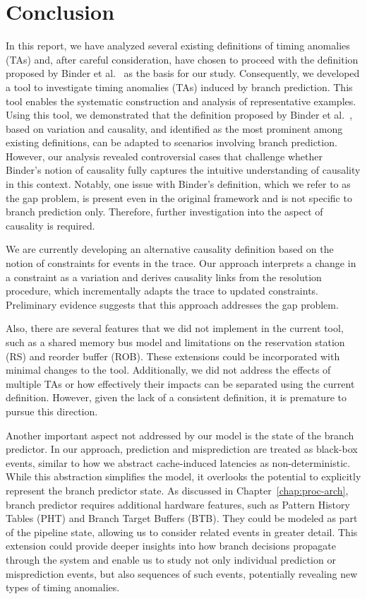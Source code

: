 \chapter{Conclusion}

In this report, we have analyzed several existing definitions of timing anomalies (TAs) and, after careful consideration, have chosen to proceed with the definition proposed by Binder et al.~\cite{binder_definitions_2022} as the basis for our study. Consequently, we developed a tool to investigate timing anomalies (TAs) induced by branch prediction. This tool enables the systematic construction and analysis of representative examples. Using this tool, we demonstrated that the definition proposed by Binder et al.~\cite{binder_definitions_2022}, based on variation and causality, and identified as the most prominent among existing definitions, can be adapted to scenarios involving branch prediction. However, our analysis revealed controversial cases that challenge whether Binder's notion of causality fully captures the intuitive understanding of causality in this context. Notably, one issue with Binder's definition, which we refer to as the gap problem, is present even in the original framework and is not specific to branch prediction only. Therefore, further investigation into the aspect of causality is required.

We are currently developing an alternative causality definition based on the notion of constraints for events in the trace. Our approach interprets a change in a constraint as a variation and derives causality links from the resolution procedure, which incrementally adapts the trace to updated constraints. Preliminary evidence suggests that this approach addresses the gap problem.

Also, there are several features that we did not implement in the current tool, such as a shared memory bus model and limitations on the reservation station (RS) and reorder buffer (ROB). These extensions could be incorporated with minimal changes to the tool. Additionally, we did not address the effects of multiple TAs or how effectively their impacts can be separated using the current definition. However, given the lack of a consistent definition, it is premature to pursue this direction.

Another important aspect not addressed by our model is the state of the branch predictor. In our approach, prediction and misprediction are treated as black-box events, similar to how we abstract cache-induced latencies as non-deterministic. While this abstraction simplifies the model, it overlooks the potential to explicitly represent the branch predictor state. As discussed in Chapter~\ref{chap:proc-arch}, branch predictor requires additional hardware features, such as Pattern History Tables (PHT) and Branch Target Buffers (BTB). They could be modeled as part of the pipeline state, allowing us to consider related events in greater detail. This extension could provide deeper insights into how branch decisions propagate through the system and enable us to study not only individual prediction or misprediction events, but also sequences of such events, potentially revealing new types of timing anomalies.
